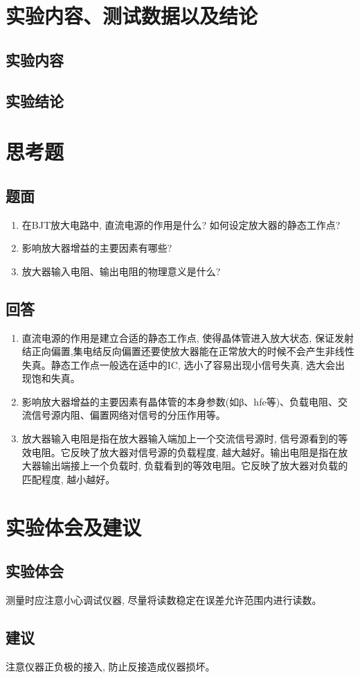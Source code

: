 \documentclass[10pt, a4paper]{article} %
\begin{document}
\section{实验内容、测试数据以及结论}
\subsection{实验内容}
\subsection{实验结论}
\section{思考题}
\subsection{题面}
\begin{enumerate}[leftmargin=50pt,label=(\arabic*)] %
    \item 在BJT放大电路中, 直流电源的作用是什么? 如何设定放大器的静态工作点? 
    \item 影响放大器增益的主要因素有哪些? 
    \item 放大器输入电阻、输出电阻的物理意义是什么? 

\end{enumerate}
\subsection{回答}

\begin{enumerate}[leftmargin=50pt,label=(\arabic*)] %
    \item 直流电源的作用是建立合适的静态工作点, 使得晶体管进入放大状态, 保证发射结正向偏置,集电结反向偏置还要使放大器能在正常放大的时候不会产生非线性失真。静态工作点一般选在适中的IC, 选小了容易出现小信号失真, 选大会出现饱和失真。
    \item 影响放大器增益的主要因素有晶体管的本身参数(如β、hfe等)、负载电阻、交流信号源内阻、偏置网络对信号的分压作用等。
    \item 放大器输入电阻是指在放大器输入端加上一个交流信号源时, 信号源看到的等效电阻。它反映了放大器对信号源的负载程度, 越大越好。输出电阻是指在放大器输出端接上一个负载时, 负载看到的等效电阻。它反映了放大器对负载的匹配程度, 越小越好。
\end{enumerate}

\section{实验体会及建议}
\subsection{实验体会}
测量时应注意小心调试仪器, 尽量将读数稳定在误差允许范围内进行读数。
\subsection{建议}
注意仪器正负极的接入, 防止反接造成仪器损坏。
\end{document}
